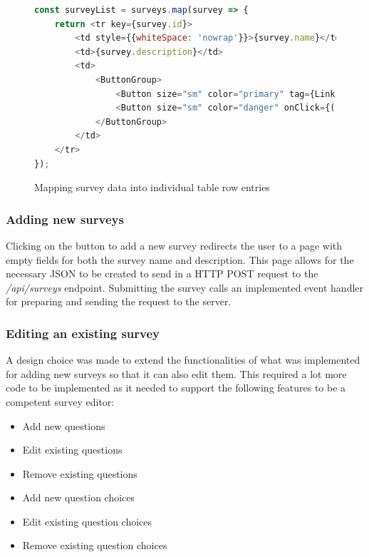 \begin{figure}[ht]
    \centering
    \begin{lstlisting}[language=JavaScript, escapechar=|]
const surveyList = surveys.map(survey => {
    return <tr key={survey.id}>
        <td style={{whiteSpace: 'nowrap'}}>{survey.name}</td>
        <td>{survey.description}</td>
        <td>
            <ButtonGroup>
                <Button size="sm" color="primary" tag={Link} to={"/surveys/" + survey.id}><MdEdit/></Button>
                <Button size="sm" color="danger" onClick={() => this.remove(survey.id)}><MdDelete/></Button>
            </ButtonGroup>
        </td>
    </tr>
});
    \end{lstlisting}
    \caption{Mapping survey data into individual table row entries}
    \label{surveylistmapping}
\end{figure}  


\subsubsection*{Adding new surveys}
Clicking on the button to add a new survey redirects the user to a page with empty fields for both the survey name and description.
This page allows for the necessary JSON to be created to send in a HTTP POST request to the \textit{/api/surveys} endpoint.
Submitting the survey calls an implemented event handler for preparing and sending the request to the server.



\subsubsection*{Editing an existing survey}
A design choice was made to extend the functionalities of what was implemented for adding new surveys so that it can also edit them.
This required a lot more code to be implemented as it needed to support the following features to be a competent survey editor:
\begin{itemize}
    \tightlist
    \item Add new questions
    \item Edit existing questions
    \item Remove existing questions 
    \item Add new question choices 
    \item Edit existing question choices
    \item Remove existing question choices
\end{itemize}

